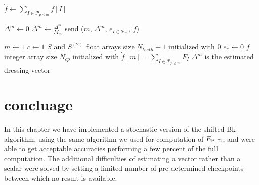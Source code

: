 \documentclass[./thesis.tex]{subfiles}
\begin{document}
\begin{algorithm}
	
	
	$\dot f \gets \sum_{I \in \mathcal{P}_{p\leq m}} f[I]$ \;
	
	$\Delta^m \gets 0$ \;
	$\Delta^m \gets \frac{\Delta^m}{M_m}$ \; 
	send ($m$, $\Delta^m$, $e_{I \in \mathcal{P}_m}$, $\dot f$) \;
\end{algorithm}


\begin{algorithm}
	$m \gets 1$ \;
	$c \gets 1$ \;
	$S$ and $S^{(2)}$ float arrays size $N_{teeth}+1$ initialized with $0$ \;
	$e_* \gets 0$ \;
	$\dot f$ integer array size $N_{cp}$ initialized with $\dot f[m] = \sum_{I \in \mathcal{P}_{p\leq m}} F_{I}$ \;
	$\Delta^m$ is the estimated dressing vector \;
	
\end{algorithm}


\section{concluage}

In this chapter we have implemented a stochastic version of the shifted-Bk algorithm, using the same algorithm we used for computation of $E_\text{PT2}$, and were able to get acceptable accuracies performing a few percent of the full computation.
The additional difficulties of estimating a vector rather than a scalar were solved by setting a limited number of pre-determined checkpoints between which no result is available.
\end{document}

